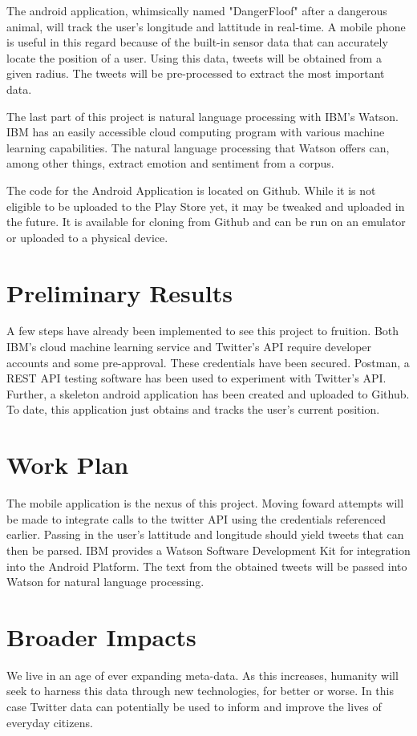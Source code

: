 \documentclass[12pt, oneside]{article}
\begin{document}
The android application, whimsically named "DangerFloof" after a dangerous animal, will track the user's longitude and lattitude in real-time. A mobile phone is useful in this regard because of the built-in sensor data that can accurately locate the position of a user. Using this data, tweets will be obtained from a given radius. The tweets will be pre-processed to extract the most important data.

The last part of this project is natural language processing with IBM's Watson.
IBM has an easily accessible cloud computing program with various machine learning capabilities\cite{IBM}. The natural language processing that Watson offers can, among other things, extract emotion and sentiment from a corpus.

The code for the Android Application is located on Github. While it is not
eligible to be uploaded to the Play Store yet, it may be tweaked and uploaded
in the future\cite{Git}. It is available for cloning from Github and can be run on an emulator or uploaded to a physical device.

\section{Preliminary Results}
A few steps have already been implemented to see this project to fruition. Both
IBM's cloud machine learning service and Twitter's API require developer
accounts and some pre-approval. These credentials have been secured.
Postman, a REST API testing software has been used to experiment with Twitter's
API\cite{Postman}.
Further, a skeleton android application has been created and uploaded to Github. To date, this application just obtains and tracks the user's current position.

\section{Work Plan}
The mobile application is the nexus of this project. Moving foward attempts will be made to integrate calls to the twitter API using the credentials referenced earlier. Passing in the user's lattitude and longitude should yield tweets that can then be parsed. IBM provides a Watson Software Development Kit for integration into the Android Platform. The text from the obtained tweets will be passed into Watson for natural language processing.


\section{Broader Impacts}
We live in an age of ever expanding meta-data. As this increases, humanity will seek to harness this data through new technologies, for better or worse. In this case Twitter data can potentially be used to inform and improve the lives of everyday citizens.


%

\end{document}

